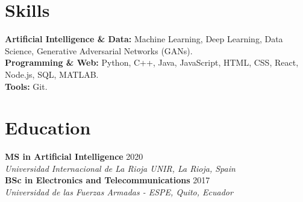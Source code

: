 \documentclass[11pt,a4paper]{article}
\begin{document}
\section*{Skills}
\textbf{Artificial Intelligence \& Data:} Machine Learning, Deep Learning, Data Science, Generative Adversarial Networks (GANs).\\[0.2em]
\textbf{Programming \& Web:} Python, C++, Java, JavaScript, HTML, CSS, React, Node.js, SQL, MATLAB.\\[0.2em]
\textbf{Tools:} Git.

\section*{Education}
\textbf{MS in Artificial Intelligence} \hfill 2020\\
\textit{Universidad Internacional de La Rioja UNIR, La Rioja, Spain} \\[0.5em]
\textbf{BSc in Electronics and Telecommunications} \hfill 2017\\
\textit{Universidad de las Fuerzas Armadas - ESPE, Quito, Ecuador}

\end{document}
